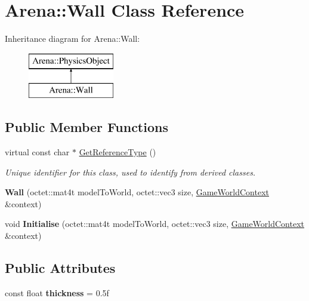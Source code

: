 \hypertarget{class_arena_1_1_wall}{\section{Arena\+:\+:Wall Class Reference}
\label{class_arena_1_1_wall}
}
Inheritance diagram for Arena\+:\+:Wall\+:\begin{figure}[H]
\begin{center}
\leavevmode
\includegraphics[height=2.000000cm]{class_arena_1_1_wall}
\end{center}
\end{figure}
\subsection*{Public Member Functions}
\begin{DoxyCompactItemize}
\item 
\hypertarget{class_arena_1_1_wall_a7fac2c618d6eb5a7050ea3c5609c1576}{virtual const char $\ast$ \hyperlink{class_arena_1_1_wall_a7fac2c618d6eb5a7050ea3c5609c1576}{Get\+Reference\+Type} ()}\label{class_arena_1_1_wall_a7fac2c618d6eb5a7050ea3c5609c1576}

\begin{DoxyCompactList}\small\item\em Unique identifier for this class, used to identify from derived classes. \end{DoxyCompactList}\item 
\hypertarget{class_arena_1_1_wall_ac87547293a73749a5c14540fb53f8efa}{{\bfseries Wall} (octet\+::mat4t model\+To\+World, octet\+::vec3 size, \hyperlink{struct_arena_1_1_game_world_context}{Game\+World\+Context} \&context)}\label{class_arena_1_1_wall_ac87547293a73749a5c14540fb53f8efa}

\item 
\hypertarget{class_arena_1_1_wall_ab3ae186ba60a14403854bb155ccc9347}{void {\bfseries Initialise} (octet\+::mat4t model\+To\+World, octet\+::vec3 size, \hyperlink{struct_arena_1_1_game_world_context}{Game\+World\+Context} \&context)}\label{class_arena_1_1_wall_ab3ae186ba60a14403854bb155ccc9347}

\end{DoxyCompactItemize}
\subsection*{Public Attributes}
\begin{DoxyCompactItemize}
\item 
\hypertarget{class_arena_1_1_wall_a56d15d6f8e0301b7ad27f5496bb51048}{const float {\bfseries thickness} = 0.\+5f}\label{class_arena_1_1_wall_a56d15d6f8e0301b7ad27f5496bb51048}

\end{DoxyCompactItemize}
